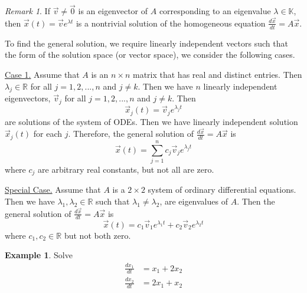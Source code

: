 \documentclass[11pt]{amsart}
\theoremstyle{definition}\newtheorem{definition}{Definition}
\theoremstyle{definition}\newtheorem{notation}{Notation}
\theoremstyle{definition}\newtheorem{example}{Example}
\theoremstyle{theorem}\newtheorem{theorem}{Theorem}
\theoremstyle{theorem}\newtheorem{corollary}{Corollary}
\theoremstyle{theorem}\newtheorem{proposition}{Proposition}
\theoremstyle{theorem}\newtheorem{lemma}{Lemma}
\theoremstyle{theorem}\newtheorem{question}{Question}
\theoremstyle{remark}\newtheorem{remark}{Remark}
\newcommand{\K}{\mathbb{K}}
\newcommand{\R}{\mathbb{R}}
\begin{document}
\begin{remark}\label{remark:1}
    If $\vec{v} \neq \vec{0}$ is an eigenvector of $A$ corresponding to an eigenvalue $\lambda \in \K$, then $\vec{x}(t) = \vec{v}e^{\lambda t}$ is a nontrivial solution of the homogeneous equation $\frac{d\vec{x}}{dt} = A\vec{x}$.
\end{remark}

To find the general solution, we require linearly independent vectors such that the form of the solution space (or vector space), we consider the following cases.

\underline{Case 1.} Assume that $A$ is an $n \times n$ matrix that has real and distinct entries. Then $\lambda_j \in \R$ for all $j = 1, 2,..., n$ and $j \neq k$. Then we have $n$ linearly independent eigenvectors, $\vec{v}_j$ for all $j = 1, 2,..., n$ and $j \neq k$. Then
\begin{equation*}
    \vec{x}_j(t) = \vec{v}_je^{\lambda_j t}
\end{equation*}
are solutions of the system of ODEs. Then we have linearly independent solution $\vec{x}_j(t)$ for each $j$. Therefore, the general solution of $\frac{d\vec{x}}{dt} = A\vec{x}$ is
\begin{equation*}
    \vec{x}(t) = \sum_{j = 1}^{n} c_j \vec{v}_j e^{\lambda_jt}
\end{equation*}
where $c_j$ are arbitrary real constants, but not all are zero.

\underline{Special Case.} Assume that $A$ is a $2 \times 2$ system of ordinary differential equations. Then we have $\lambda_1, \lambda_2 \in \R$ such that $\lambda_1 \neq \lambda_2$, are eigenvalues of $A$. Then the general solution of $\frac{d\vec{x}}{dt} = A\vec{x}$ is
\begin{equation*}
    \vec{x}(t) = c_1 \vec{v}_1e^{\lambda_1 t} + c_2\vec{v}_2 e^{\lambda_2 t}
\end{equation*}
where $c_1, c_2 \in \R$ but not both zero.

\begin{example}
    Solve
    \begin{align*}
        \frac{dx_1}{dt} &= x_1 + 2x_2 \\
        \frac{dx_2}{dt} &= 2x_1 + x_2
    \end{align*}
\end{example}
\end{document}
